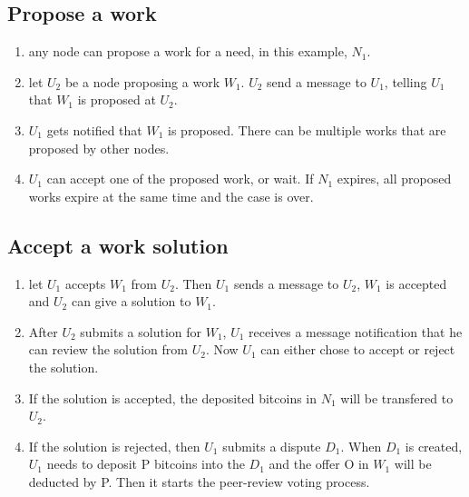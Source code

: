 \documentclass[12pt]{article}
\begin{document}
\subsection{Propose a work}
\begin{enumerate}
	\item any node can propose a work for a need, in this example, $N_1$. 
	\item let $U_2$ be a node proposing a work $W_1$. $U_2$ send a message to $U_1$, telling $U_1$ that $W_1$ is proposed at $U_2$.
	\item $U_1$ gets notified that $W_1$ is proposed. There can be multiple works that are proposed by other nodes. 
	\item $U_1$ can accept one of the proposed work, or wait. If $N_1$ expires, all proposed works expire at the same time and the case is over.
\end{enumerate}

\subsection{Accept a work solution}
\begin{enumerate}
	\item let $U_1$ accepts $W_1$ from $U_2$. Then $U_1$ sends a message to $U_2$, $W_1$ is accepted and $U_2$ can give a solution to $W_1$.
	\item After $U_2$ submits a solution for $W_1$, $U_1$ receives a message notification that he can review the solution from $U_2$. Now $U_1$ can either chose to accept or reject the solution.
	\item If the solution is accepted, the deposited bitcoins in $N_1$ will be transfered to $U_2$.
	\item If the solution is rejected, then $U_1$ submits a dispute $D_1$. When $D_1$ is created, $U_1$ needs to deposit P bitcoins into the $D_1$ and the offer O in $W_1$ will be deducted by P. Then it starts the peer-review voting process.
\end{enumerate}
\end{document}

